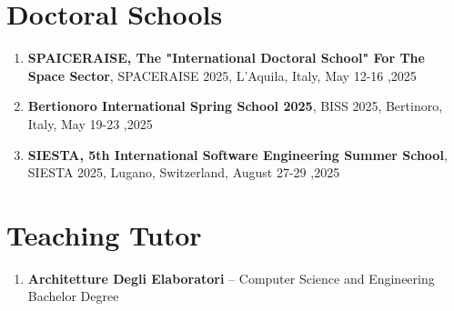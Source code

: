 \documentclass[runningheads]{llncs}
\begin{document}

    \section{Doctoral Schools}\label{sec:doctoral-schools}
    \begin{enumerate}
        \item \textbf{SPAICERAISE, The "International Doctoral School" For The Space Sector}, SPACERAISE 2025, L'Aquila, Italy, May 12-16 ,2025
        \item \textbf{Bertionoro International Spring School 2025}, BISS 2025, Bertinoro, Italy, May 19-23 ,2025
        \item \textbf{SIESTA, 5th International Software Engineering Summer School}, SIESTA 2025, Lugano, Switzerland, August 27-29 ,2025
    \end{enumerate}

    \section{Teaching Tutor}
    \begin{enumerate}
        \item \textbf{Architetture Degli Elaboratori} -- Computer Science and Engineering Bachelor Degree
    \end{enumerate}
\end{document}
